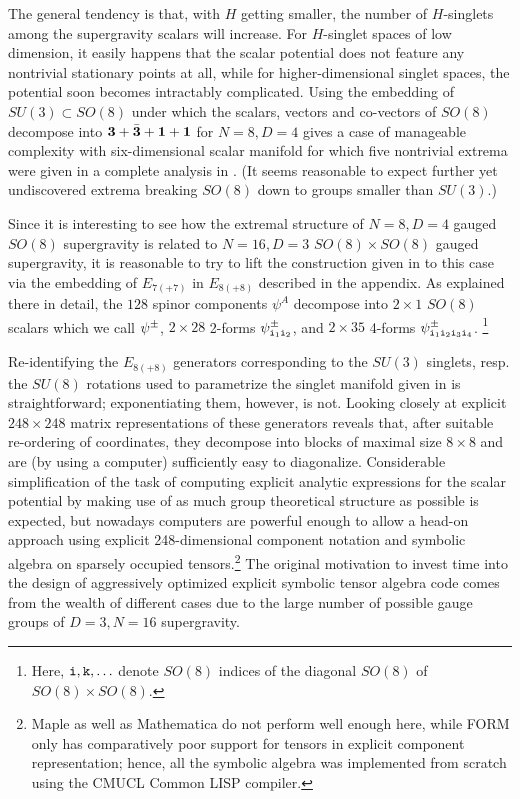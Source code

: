 \documentclass[a4paper,12pt]{article}
\begin{document}
The general tendency is that, with $H$ getting smaller, the number of
$H$-singlets among the supergravity scalars will increase. For
$H$-singlet spaces of low dimension, it easily happens that the scalar
potential does not feature any nontrivial stationary points at all,
while for higher-dimensional singlet spaces, the potential soon
becomes intractably complicated. Using the embedding of $SU(3)\subset
SO(8)$ under which the scalars, vectors and co-vectors of $SO(8)$
decompose into ${\bf 3}+\bar {\bf 3}+{\bf 1}+{\bf 1}$ for $N=8, D=4$
gives a case of manageable complexity with six-dimensional scalar
manifold for which five nontrivial extrema were given in a complete
analysis in
\cite{Warner:vz}. (It seems reasonable to expect further
yet undiscovered extrema breaking $SO(8)$ down to groups smaller than
$SU(3)$.)

Since it is interesting to see how the extremal structure of $N=8,
D=4$ gauged $SO(8)$ supergravity is related to $N=16, D=3$
$SO(8)\times SO(8)$ gauged supergravity, it is reasonable to try to
lift the construction given in \cite{Warner:vz} to this case via the
embedding of $E_{7(+7)}$ in $E_{8(+8)}$ described in the appendix. As
explained there in detail, the $128$ spinor components $\psi^A$
decompose into $2\times 1$ $SO(8)$ scalars which we call $\psi^\pm_{}$,
$2\times 28$ 2-forms $\psi^\pm_{{\tt i}_1 {\tt i}_2}$, and
$2\times 35$ 4-forms $\psi^\pm_{{\tt i}_1 {\tt i}_2 {\tt i}_3{\tt i}_4}$.%
\footnote{Here, ${\tt i}, {\tt k},\ldots$ denote
$SO(8)$ indices of the diagonal $SO(8)$ of $SO(8)\times SO(8)$.}

Re-identifying the $E_{8(+8)}$ generators corresponding to the $SU(3)$
singlets, resp. the $SU(8)$ rotations used to parametrize the singlet
manifold given in \cite{Warner:vz} is straightforward; exponentiating
them, however, is not. Looking closely at explicit $248\times248$
matrix representations of these generators reveals that, after
suitable re-ordering of coordinates, they decompose into blocks of
maximal size $8\times8$ and are (by using a computer) sufficiently
easy to diagonalize.  Considerable simplification of the task of
computing explicit analytic expressions for the scalar potential by
making use of as much group theoretical structure as possible is
expected, but nowadays computers are powerful enough to allow a
head-on approach using explicit 248-dimensional component notation and
symbolic algebra on sparsely occupied tensors.\footnote{Maple as well
as Mathematica do not perform well enough here, while FORM only has
comparatively poor support for tensors in explicit component
representation; hence, all the symbolic algebra was implemented from
scratch using the CMUCL Common LISP compiler.} The original motivation
to invest time into the design of aggressively optimized explicit
symbolic tensor algebra code comes from the wealth of different cases
due to the large number of possible gauge groups of $D=3, N=16$
supergravity.
\end{document}
